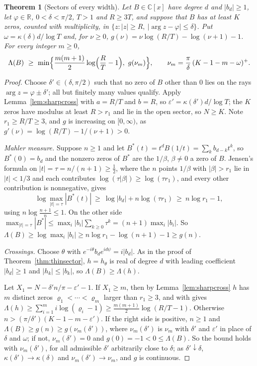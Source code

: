\documentclass[11pt]{article}
\newtheorem{theorem}{Theorem}[section]
\newcommand{\R}{\mathbb R}
\begin{document}
\begin{theorem}[Sectors of every width]\label{thm:widesector}
Let $B\in\mathbb C[x]$ have degree $d$ and $|b_d|\ge1$, let $\varphi\in\R$,
$0<\delta<\pi/2$, $T>1$ and $R\ge3T$, and suppose that $B$ has at least $K$
zeros, counted with multiplicity, in
$\{z:|z|\ge R,\ |\arg z-\varphi|\le\delta\}$.  Put
$\omega=\kappa(\delta)d/\log T$ and, for $\nu\ge0$,
$g(\nu)=\nu\log(R/T)-\log(\nu+1)-1$.  For every integer $m\ge0$,
\[
  \Lambda(B)\ \ge\ \min\Bigl\{\frac{m(m+1)}2\log\Bigl(\frac RT-1\Bigr),\
  g(\nu_m)\Bigr\},\qquad
  \nu_m=\frac\pi\delta\,(K-1-m-\omega)^+ .
\]
\end{theorem}

\begin{proof}
Choose $\delta'\in(\delta,\pi/2)$ such that no zero of $B$ other than $0$ lies
on the rays $\arg z=\varphi\pm\delta'$; all but finitely many values qualify.
Apply Lemma~\ref{lem:sharpcross} with $a=R/T$ and $b=R$, so
$\varepsilon'=\kappa(\delta')d/\log T$; the $K$ zeros have modulus at least
$R>r_1$ and lie in the open sector, so $N\ge K$.  Note $r_1\ge R/T\ge3$, and
$g$ is increasing on $[0,\infty)$, as $g'(\nu)=\log(R/T)-1/(\nu+1)>0$.

\emph{Mahler measure.}  Suppose $n\ge1$ and let
$B^*(t)=t^dB(1/t)=\sum_kb_{d-k}t^k$, so $B^*(0)=b_d$ and the nonzero zeros of
$B^*$ are the $1/\beta$, $\beta\ne0$ a zero of $B$.  Jensen's formula on
$|t|=\tau=n/(n+1)\ge\frac12$, where the $n$ points $1/\beta$ with
$|\beta|>r_1$ lie in $|t|<1/3$ and each contributes $\log(\tau|\beta|)\ge\log(\tau r_1)$,
and every other contribution is nonnegative, gives
\[
  \log\max_{|t|=\tau}|B^*(t)|\ \ge\ \log|b_d|+n\log(\tau r_1)\ \ge\ n\log r_1-1,
\]
using $n\log\frac{n+1}n\le1$.  On the other side
$\max_{|t|=\tau}|B^*|\le\max_i|b_i|\sum_{k\ge0}\tau^k=(n+1)\max_i|b_i|$.  So
$\Lambda(B)\ge\log\max_i|b_i|\ge n\log r_1-\log(n+1)-1\ge g(n)$.

\emph{Crossings.}  Choose $\theta$ with $e^{-i\theta}b_de^{id\psi}=i|b_d|$.  As
in the proof of Theorem~\ref{thm:thinsector}, $h=h_\theta$ is real of degree
$d$ with leading coefficient $|b_d|\ge1$ and $|h_k|\le|b_k|$, so
$\Lambda(B)\ge\Lambda(h)$.

Let $X_1=N-\delta'n/\pi-\varepsilon'-1$.  If $X_1\ge m$, then by
Lemma~\ref{lem:sharpcross} $h$ has $m$ distinct zeros
$\varrho_1<\cdots<\varrho_m$ larger than $r_1\ge3$, and \cite[Theorem~3.2]{coefficient-mass} with \cite[Corollary~3.4]{coefficient-mass} gives
$\Lambda(h)\ge\sum_{i=1}^mi\log(\varrho_i-1)\ge\frac{m(m+1)}2\log(R/T-1)$.
Otherwise $n>(\pi/\delta')(K-1-m-\varepsilon')$.  If the right side is positive,
$n\ge1$ and $\Lambda(B)\ge g(n)\ge g(\nu_m(\delta'))$, where $\nu_m(\delta')$
is $\nu_m$ with $\delta'$ and $\varepsilon'$ in place of $\delta$ and $\omega$; if not,
$\nu_m(\delta')=0$ and $g(0)=-1<0\le\Lambda(B)$.  So the bound holds with
$\nu_m(\delta')$, for all admissible $\delta'$ arbitrarily close to $\delta$;
as $\delta'\downarrow\delta$, $\kappa(\delta')\to\kappa(\delta)$ and
$\nu_m(\delta')\to\nu_m$, and $g$ is continuous.

\end{proof}
\end{document}

